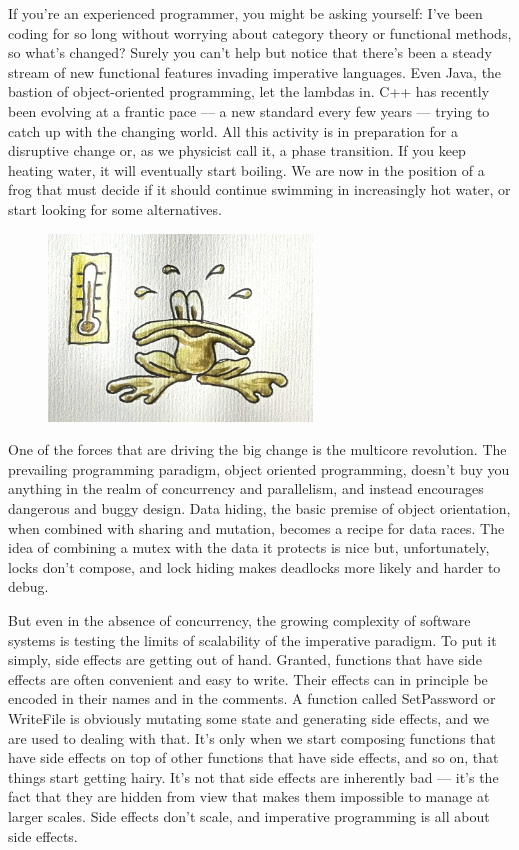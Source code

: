 If you're an experienced programmer, you might be asking yourself: I've
been coding for so long without worrying about category theory or
functional methods, so what's changed? Surely you can't help but notice
that there's been a steady stream of new functional features invading
imperative languages. Even Java, the bastion of object-oriented
programming, let the lambdas in. C++ has recently been evolving at a
frantic pace --- a new standard every few years --- trying to catch up
with the changing world. All this activity is in preparation for a
disruptive change or, as we physicist call it, a phase transition. If
you keep heating water, it will eventually start boiling. We are now in
the position of a frog that must decide if it should continue swimming
in increasingly hot water, or start looking for some alternatives.

\begin{figure}
\centering
\includegraphics[width=70mm]{images/img_1299.jpg}
\end{figure}

One of the forces that are driving the big change is the multicore
revolution. The prevailing programming paradigm, object oriented
programming, doesn't buy you anything in the realm of concurrency and
parallelism, and instead encourages dangerous and buggy design. Data
hiding, the basic premise of object orientation, when combined with
sharing and mutation, becomes a recipe for data races. The idea of
combining a mutex with the data it protects is nice but, unfortunately,
locks don't compose, and lock hiding makes deadlocks more likely and
harder to debug.

But even in the absence of concurrency, the growing complexity of
software systems is testing the limits of scalability of the imperative
paradigm. To put it simply, side effects are getting out of hand.
Granted, functions that have side effects are often convenient and easy
to write. Their effects can in principle be encoded in their names and
in the comments. A function called SetPassword or WriteFile is obviously
mutating some state and generating side effects, and we are used to
dealing with that. It's only when we start composing functions that have
side effects on top of other functions that have side effects, and so
on, that things start getting hairy. It's not that side effects are
inherently bad --- it's the fact that they are hidden from view that
makes them impossible to manage at larger scales. Side effects don't
scale, and imperative programming is all about side effects.

